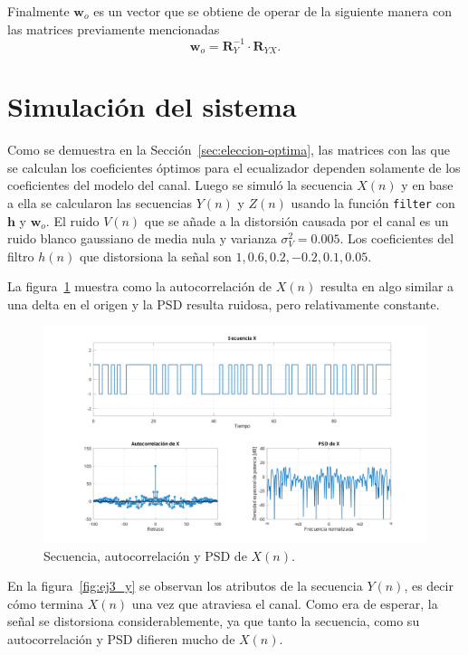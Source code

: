 Finalmente $\mathbf{w}_o$ es un vector que se obtiene de operar de la siguiente manera con las matrices previamente mencionadas
\begin{equation*}
	\mathbf{w}_o = \mathbf{R}_Y^{-1} \cdot \mathbf{R}_{YX}.
\end{equation*}

\section{Simulación del sistema}

Como se demuestra en la Sección~\ref{sec:eleccion-optima}, las matrices con las que se calculan los coeficientes óptimos para el ecualizador dependen solamente de los coeficientes del modelo del canal. Luego se simuló la secuencia $X(n)$ y en base a ella se calcularon las secuencias $Y(n)$ y $Z(n)$ usando la función \verb|filter| con $\mathbf{h}$ y $\mathbf{w}_o$. El ruido $V(n)$ que se añade a la distorsión causada por el canal es un ruido blanco gaussiano de media nula y varianza $\sigma_V^2 = 0.005$. Los coeficientes del filtro $h(n)$ que distorsiona la señal son ${1, 0.6, 0.2, -0.2, 0.1, 0.05}$.

La figura~\ref{fig:ej3_x} muestra como la autocorrelación de $X(n)$ resulta en algo similar a una delta en el origen y la PSD resulta ruidosa, pero relativamente constante.

\begin{figure}[!hbp]
	\centering
    \includegraphics[width=1\linewidth,trim=4cm 0 4cm 0,clip]{img/ej3_x.pdf}
	\caption{Secuencia, autocorrelación y PSD de $X(n)$.}
	\label{fig:ej3_x}
\end{figure}

En la figura~\ref{fig:ej3_y} se observan los atributos de la secuencia $Y(n)$, es decir cómo termina $X(n)$ una vez que atraviesa el canal. Como era de esperar, la señal se distorsiona considerablemente, ya que tanto la secuencia, como su autocorrelación y PSD difieren mucho de $X(n)$.

